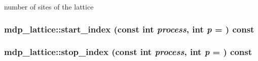 number of sites of the lattice \hypertarget{classmdp__lattice_a9cc8de7512a9ff465f22e4ddaf307e38}{
\subsubsection[{start\_\-index}]{ mdp\_\-lattice::start\_\-index (const int {\em process}, \/  int {\em p} = {}) const}}
\label{classmdp__lattice_a9cc8de7512a9ff465f22e4ddaf307e38}
\hypertarget{classmdp__lattice_ada0f943b50d6aeb302e4fc6cf2fcabb9}{
\subsubsection[{stop\_\-index}]{ mdp\_\-lattice::stop\_\-index (const int {\em process}, \/  int {\em p} = {}) const}}
\label{classmdp__lattice_ada0f943b50d6aeb302e4fc6cf2fcabb9}


